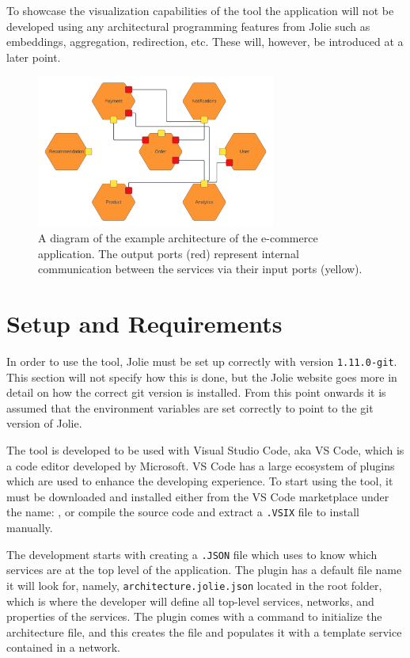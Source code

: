 To showcase the visualization capabilities of the tool the application will not be developed using any architectural programming features from Jolie such as embeddings, aggregation, redirection, etc.
These will, however, be introduced at a later point.

\begin{figure}[h!]
    \center
    \includegraphics[width=0.70\textwidth]{figures/full_example_lc.png}
    \caption{A diagram of the example architecture of the e-commerce application. The output ports (red) represent internal communication between the services via their input ports (yellow).}
    \label{figure:full_example_lc}
\end{figure}

\section{Setup and Requirements}
In order to use the tool, Jolie must be set up correctly with version \texttt{1.11.0-git}. This section will not specify how this is done, but the Jolie website goes more in detail on how
the correct git version is installed. From this point onwards it is assumed that the environment variables are set correctly to point to the git version of Jolie.

The tool is developed to be used with Visual Studio Code, aka VS Code, which is a code editor developed by Microsoft.
VS Code has a large ecosystem of plugins which are used to enhance the developing experience.
To start using the tool, it must be downloaded and installed either from the VS Code marketplace under the name: \texttt{\toolname}, or compile the source code and extract a \texttt{.VSIX} file to install manually.

The development starts with creating a \texttt{.JSON} file which \toolname[] uses to know which services are at the top level of the application.
The plugin has a default file name it will look for, namely, \texttt{architecture.jolie.json} located in the root folder, which is where the developer will define all top-level services, networks, and properties of the services.
The plugin comes with a command to initialize the architecture file, and this creates the file and populates it with a template service contained in a network.

